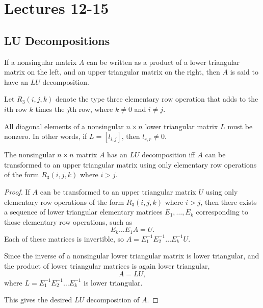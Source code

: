 \section{Lectures 12-15}
\subsection{LU Decompositions}
\begin{definition}
  If a nonsingular matrix $A$ can be written as a product of a lower triangular matrix on the left, 
  and an upper triangular matrix on the right, then $A$ is said to have an $LU$ decomposition.
\end{definition}

Let $R_{3}(i, j, k)$ denote the type three elementary row operation that adds to the $i$th row $k$ times the $j$th row,
where $k \neq 0$ and $i \neq j$.

\begin{lemma}
  All diagonal elements of a nonsingular $n \times n$ lower triangular matrix $L$ must be nonzero.
  In other words, if $L = \left[l_{i, j}\right]$, then $l_{r, r} \neq 0$.
\end{lemma}

\begin{theorem}
  The nonsingular $n \times n$ matrix $A$ has an $LU$ decomposition iff $A$ can be transformed to an upper triangular matrix
  using only elementary row operations of the form $R_{3} (i, j, k)$ where $i > j$.
\end{theorem}

\begin{proof}
  If $A$ can be transformed to an upper triangular matrix $U$ using only elementary row operations of the form 
  $R_{3}(i, j, k)$ where $i > j$, then there exists a sequence of lower triangular elementary matrices $E_{1}, \dots, E_{k}$
  corresponding to those elementary row operations, such as 
  \begin{equation*}
    E_{k} \dots E_{1} A = U.
  \end{equation*}
  Each of these matrices is invertible, so $A = E^{-1}_{1} E^{-1}_{2} \dots E^{-1}_{k}U$.

  Since the inverse of a nonsingular lower triangular matrix is lower triangular, 
  and the product of lower triangular matrices is again lower triangular,
  \begin{equation*}
    A = LU,
  \end{equation*}
  where $L = E^{-1}_{1} E^{-1}_{2} \dots E^{-1}_{k}$ is lower triangular. 

  This gives the desired $LU$ decomposition of $A$.
\end{proof}

